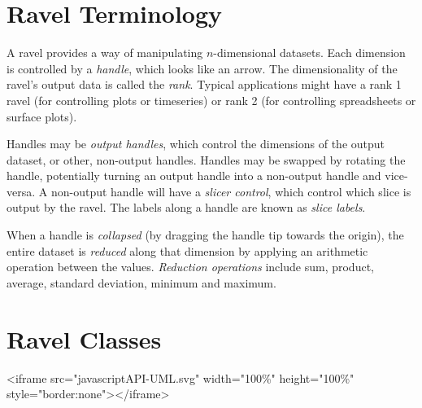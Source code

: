 \documentclass{article}
\begin{document}
\section{Ravel Terminology}

A ravel provides a way of manipulating $n$-dimensional datasets. Each
dimension is controlled by a {\em handle}, which looks like an
arrow. The dimensionality of the ravel's output data is called the
{\em rank}. Typical applications might have a rank 1 ravel (for
controlling plots or timeseries) or rank 2 (for controlling
spreadsheets or surface plots).

Handles may be {\em output handles}, which control the dimensions of
the output dataset, or other, non-output handles. Handles may
be swapped by rotating the handle, potentially turning an output
handle into a non-output handle and vice-versa. A non-output handle
will have a {\em slicer control}, which control which slice is output
by the ravel. The labels along a handle are known as {\em slice labels}.

When a handle is {\em collapsed} (by dragging the handle tip towards
the origin), the entire dataset is {\em reduced} along that dimension
by applying an arithmetic operation between the values. {\em Reduction
operations} include sum, product, average, standard deviation, minimum
and maximum.

\section{Ravel Classes}

\begin{latexonly}
\end{latexonly}

\begin{rawhtml}
  <iframe src="javascriptAPI-UML.svg" width="100\%" height="100\%" style="border:none"></iframe>
\end{rawhtml}
\end{document}
